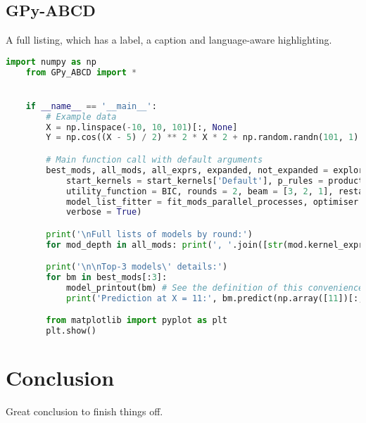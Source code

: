 \documentclass[a4paper,12pt]{article}
\begin{document}
\subsection{GPy-ABCD}
\label{sec:Sub_GPyABCD}

A full listing, which has a label, a caption and language-aware highlighting.

\begin{lstlisting}[label=lst:GPyABCD_function, language=Python, caption=Main GPy-ABCD \cite{GPy_ABCD} model-space search function with default arguments, breaklines=true, basicstyle=\ttfamily\small]
    import numpy as np
    from GPy_ABCD import *


    if __name__ == '__main__':
        # Example data
        X = np.linspace(-10, 10, 101)[:, None]
        Y = np.cos((X - 5) / 2) ** 2 * X * 2 + np.random.randn(101, 1)

        # Main function call with default arguments
        best_mods, all_mods, all_exprs, expanded, not_expanded = explore_model_space(X, Y,
            start_kernels = start_kernels['Default'], p_rules = production_rules['Default'],
            utility_function = BIC, rounds = 2, beam = [3, 2, 1], restarts = 5,
            model_list_fitter = fit_mods_parallel_processes, optimiser = GPy_optimisers[0],
            verbose = True)

        print('\nFull lists of models by round:')
        for mod_depth in all_mods: print(', '.join([str(mod.kernel_expression) for mod in mod_depth]) + f'\n{len(mod_depth)}')

        print('\n\nTop-3 models\' details:')
        for bm in best_mods[:3]:
            model_printout(bm) # See the definition of this convenience function for examples of model details' extraction
            print('Prediction at X = 11:', bm.predict(np.array([11])[:, None]), '\n')

        from matplotlib import pyplot as plt
        plt.show()
\end{lstlisting}


 
\section*{Conclusion}
\label{sec:Conclusion}

Great conclusion to finish things off.


 
\end{document}
